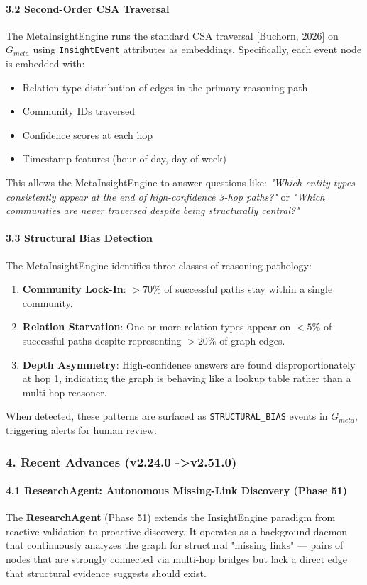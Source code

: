 \paragraph{3.2 Second-Order CSA Traversal}
The MetaInsightEngine runs the standard CSA traversal [Buchorn, 2026] on $G_{meta}$ using \texttt{InsightEvent} attributes as embeddings. Specif\-ically, each event node is embedded with:
\begin{itemize}
\item Relation-type distr\-ibution of edges in the primary reasoning path
\item Community IDs traversed
\item Confidence scores at each hop
\item Timestamp features (hour-of-day, day-of-week)

\end{itemize}
This allows the MetaInsightEngine to answer questions like: \textit{"Which entity types consi\-stently appear at the end of high-confidence 3-hop paths?"} or \textit{"Which communities are never traversed despite being struc\-turally central?"}

\paragraph{3.3 Structural Bias Detection}
The MetaInsightEngine identifies three classes of reasoning pathology:
\begin{enumerate}
\item \textbf{Community Lock-In}: $> 70\%$ of successful paths stay within a single community.
\item \textbf{Relation Starvation}: One or more relation types appear on $< 5\%$ of successful paths despite repre\-senting $> 20\%$ of graph edges.
\item \textbf{Depth Asymmetry}: High-confidence answers are found dispr\-oportionately at hop 1, indicating the graph is behaving like a lookup table rather than a multi-hop reasoner.

\end{enumerate}
When detected, these patterns are surfaced as \texttt{STRUCTURAL\_BIAS} events in $G_{meta}$, triggering alerts for human review.

\subsubsection{4. Recent Advances (v2.24.0 -\textgreater  v2.51.0)}

\paragraph{4.1 ResearchAgent: Autonomous Missing-Link Discovery (Phase 51)}
The \textbf{ResearchAgent} (Phase 51) extends the InsightEngine paradigm from reactive validation to proactive discovery. It operates as a background daemon that conti\-nuously analyzes the graph for structural "missing links" — pairs of nodes that are strongly connected via multi-hop bridges but lack a direct edge that structural evidence suggests should exist.

